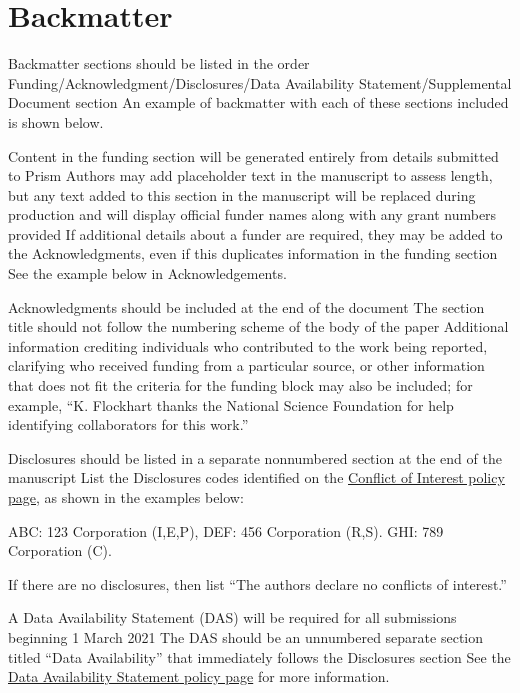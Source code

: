 \documentclass{osa-article}
\begin{document}
\section{Backmatter}

Backmatter sections should be listed in the order Funding/Acknowledgment/Disclosures/Data Availability Statement/Supplemental Document section
An example of backmatter with each of these sections included is shown below.

\begin{backmatter}
Content in the funding section will be generated entirely from details submitted to Prism
Authors may add placeholder text in the manuscript to assess length, but any text added to this section in the manuscript will be replaced during production and will display official funder names along with any grant numbers provided
If additional details about a funder are required, they may be added to the Acknowledgments, even if this duplicates information in the funding section
See the example below in Acknowledgements.

Acknowledgments should be included at the end of the document
The section title should not follow the numbering scheme of the body of the paper
Additional information crediting individuals who contributed to the work being reported, clarifying who received funding from a particular source, or other information that does not fit the criteria for the funding block may also be included; for example, ``K. Flockhart thanks the National Science Foundation for help identifying collaborators for this work.''

Disclosures should be listed in a separate nonnumbered section at the end of the manuscript
List the Disclosures codes identified on the \href{https://opg.optica.org/submit/review/conflicts-interest-policy.cfm}{Conflict of Interest policy page}, as shown in the examples below:

\medskip

\noindent ABC: 123 Corporation (I,E,P), DEF: 456 Corporation (R,S). GHI: 789 Corporation (C).

\medskip

\noindent If there are no disclosures, then list ``The authors declare no conflicts of interest.''


A Data Availability Statement (DAS) will be required for all submissions beginning 1 March 2021
The DAS should be an unnumbered separate section titled ``Data Availability'' that
immediately follows the Disclosures section
See the \href{https://www.osapublishing.org/submit/review/data-availability-policy.cfm}{Data Availability Statement policy page} for more information.


\end{backmatter}
\end{document}
